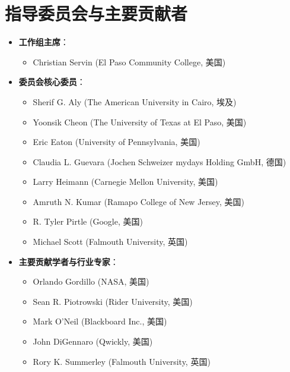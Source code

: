 \section{指导委员会与主要贡献者}

\begin{itemize}
    \item \textbf{工作组主席}：
    \begin{itemize}
        \item Christian Servin (El Paso Community College, 美国)
    \end{itemize}
    \item \textbf{委员会核心委员}：
    \begin{itemize}
        \item Sherif G. Aly (The American University in Cairo, 埃及)
        \item Yoonsik Cheon (The University of Texas at El Paso, 美国)
        \item Eric Eaton (University of Pennsylvania, 美国)
        \item Claudia L. Guevara (Jochen Schweizer mydays Holding GmbH, 德国)
        \item Larry Heimann (Carnegie Mellon University, 美国)
        \item Amruth N. Kumar (Ramapo College of New Jersey, 美国)
        \item R. Tyler Pirtle (Google, 美国)
        \item Michael Scott (Falmouth University, 英国)
    \end{itemize}
    \item \textbf{主要贡献学者与行业专家}：
    \begin{itemize}
        \item Orlando Gordillo (NASA, 美国)
        \item Sean R. Piotrowski (Rider University, 美国)
        \item Mark O'Neil (Blackboard Inc., 美国)
        \item John DiGennaro (Qwickly, 美国)
        \item Rory K. Summerley (Falmouth University, 英国)
    \end{itemize}
\end{itemize}

